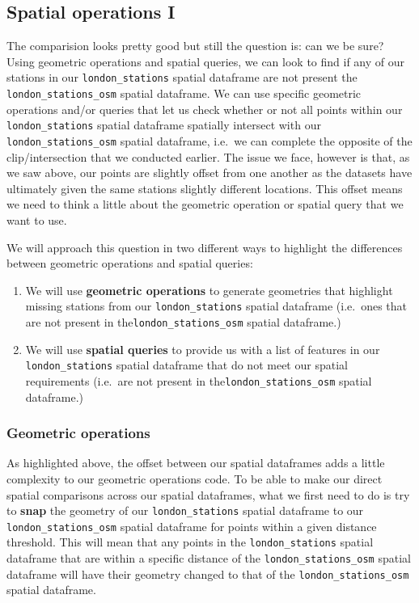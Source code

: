 \documentclass[
]{book}
\providecommand{\tightlist}{%
  \setlength{\itemsep}{0pt}\setlength{\parskip}{0pt}}
\begin{document}
\hypertarget{spatial-operations-i}{%
\subsection{Spatial operations I}\label{spatial-operations-i}}

The comparision looks pretty good but still the question is: can we be sure? Using geometric operations and spatial queries, we can look to find if any of our stations in our \texttt{london\_stations} spatial dataframe are not present the \texttt{london\_stations\_osm} spatial dataframe. We can use specific geometric operations and/or queries that let us check whether or not all points within our \texttt{london\_stations} spatial dataframe spatially intersect with our \texttt{london\_stations\_osm} spatial dataframe, i.e.~we can complete the opposite of the clip/intersection that we conducted earlier. The issue we face, however is that, as we saw above, our points are slightly offset from one another as the datasets have ultimately given the same stations slightly different locations. This offset means we need to think a little about the geometric operation or spatial query that we want to use.

We will approach this question in two different ways to highlight the differences between geometric operations and spatial queries:

\begin{enumerate}
\def\labelenumi{\arabic{enumi}.}
\tightlist
\item
  We will use \textbf{geometric operations} to generate geometries that highlight missing stations from our \texttt{london\_stations} spatial dataframe (i.e.~ones that are not present in the\texttt{london\_stations\_osm} spatial dataframe.)
\item
  We will use \textbf{spatial queries} to provide us with a list of features in our \texttt{london\_stations} spatial dataframe that do not meet our spatial requirements (i.e.~are not present in the\texttt{london\_stations\_osm} spatial dataframe.)
\end{enumerate}

\hypertarget{geometric-operations}{%
\subsubsection{Geometric operations}\label{geometric-operations}}

As highlighted above, the offset between our spatial dataframes adds a little complexity to our geometric operations code. To be able to make our direct spatial comparisons across our spatial dataframes, what we first need to do is try to \textbf{snap} the geometry of our \texttt{london\_stations} spatial dataframe to our \texttt{london\_stations\_osm} spatial dataframe for points within a given distance threshold. This will mean that any points in the \texttt{london\_stations} spatial dataframe that are within a specific distance of the \texttt{london\_stations\_osm} spatial dataframe will have their geometry changed to that of the \texttt{london\_stations\_osm} spatial dataframe.
\end{document}
